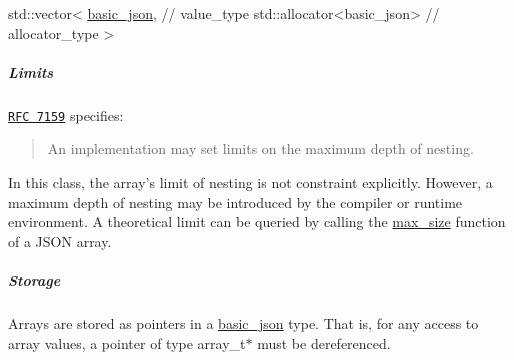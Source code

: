 \begin{DoxyCode}
std::vector<
  \hyperlink{classnlohmann_1_1basic__json_a53771a7a4f2787125e55f64448f24ce6}{basic\_json}, \textcolor{comment}{// value\_type}
  std::allocator<basic\_json> \textcolor{comment}{// allocator\_type}
>
\end{DoxyCode}


\subparagraph*{Limits}

\href{http://rfc7159.net/rfc7159}{\tt R\-F\-C 7159} specifies\-: \begin{quotation}
An implementation may set limits on the maximum depth of nesting.

\end{quotation}


In this class, the array's limit of nesting is not constraint explicitly. However, a maximum depth of nesting may be introduced by the compiler or runtime environment. A theoretical limit can be queried by calling the \hyperlink{classnlohmann_1_1basic__json_a7936417b875b7ec737f77ef84bbf7871}{max\-\_\-size} function of a J\-S\-O\-N array.

\subparagraph*{Storage}

Arrays are stored as pointers in a \hyperlink{classnlohmann_1_1basic__json}{basic\-\_\-json} type. That is, for any access to array values, a pointer of type {\ttfamily array\-\_\-t$\ast$} must be dereferenced.

